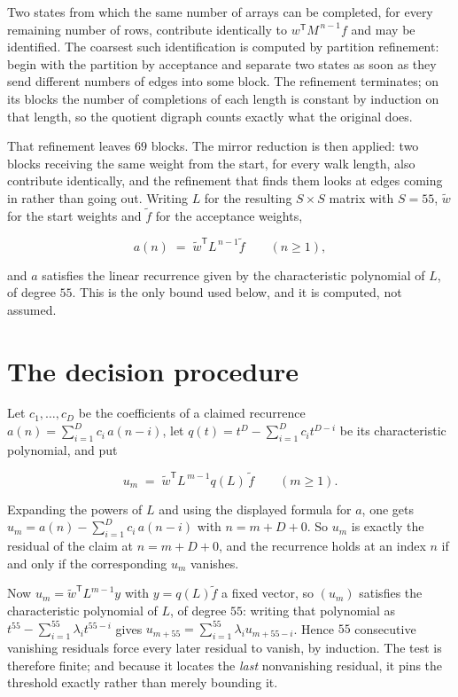 \documentclass[11pt]{article}
\theoremstyle{definition}
\begin{document}
Two states from which the same number of arrays can be completed, for every remaining number of rows, contribute identically to $w^{\mathsf T}M^{\,n-1}f$ and may be identified. The coarsest such identification is computed by partition refinement: begin with the partition by acceptance and separate two states as soon as they send different numbers of edges into some block. The refinement terminates; on its blocks the number of completions of each length is constant by induction on that length, so the quotient digraph counts exactly what the original does.

That refinement leaves $69$ blocks. The mirror reduction is then applied: two blocks receiving the same weight from the start, for every walk length, also contribute identically, and the refinement that finds them looks at edges coming in rather than going out. Writing $L$ for the resulting $S \times S$ matrix with $S = 55$, $\tilde w$ for the start weights and $\tilde f$ for the acceptance weights,

\[a(n) \;=\; \tilde w^{\mathsf T} L^{\,n-1} \tilde f \qquad (n \ge 1),\]

and $a$ satisfies the linear recurrence given by the characteristic polynomial of $L$, of degree $55$. This is the only bound used below, and it is computed, not assumed.

\section{The decision procedure}

Let $c_1,\dots,c_D$ be the coefficients of a claimed recurrence $a(n) = \sum_{i=1}^{D} c_i\,a(n-i)$, let $q(t) = t^{D} - \sum_{i=1}^{D} c_i t^{D-i}$ be its characteristic polynomial, and put

\[u_m \;=\; \tilde w^{\mathsf T} L^{\,m-1} q(L)\,\tilde f \qquad (m \ge 1).\]

Expanding the powers of $L$ and using the displayed formula for $a$, one gets $u_m = a(n) - \sum_{i=1}^{D} c_i\,a(n-i)$ with $n = m + D + 0$. So $u_m$ is exactly the residual of the claim at $n = m + D + 0$, and the recurrence holds at an index $n$ if and only if the corresponding $u_m$ vanishes.

Now $u_m = \tilde w^{\mathsf T} L^{m-1} y$ with $y = q(L)\tilde f$ a fixed vector, so $(u_m)$ satisfies the characteristic polynomial of $L$, of degree $55$: writing that polynomial as $t^{55} - \sum_{i=1}^{55} \lambda_i t^{55-i}$ gives $u_{m+55} = \sum_{i=1}^{55} \lambda_i u_{m+55-i}$. Hence $55$ consecutive vanishing residuals force every later residual to vanish, by induction. The test is therefore finite; and because it locates the {\itshape last} nonvanishing residual, it pins the threshold exactly rather than merely bounding it.
\end{document}
